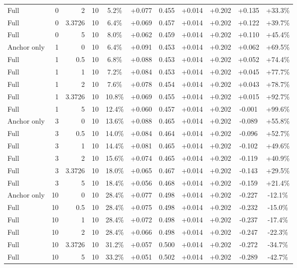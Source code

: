 \begin{table}[htbp]
\begin{tabular}{lrrrccccccc}
Full & 0 & 2 & 10 & 5.2\% & +0.077 & 0.455 & +0.014 & +0.202 & +0.135 & +33.3\% \\
Full & 0 & 3.3726 & 10 & 6.4\% & +0.069 & 0.457 & +0.014 & +0.202 & +0.122 & +39.7\% \\
Full & 0 & 5 & 10 & 8.0\% & +0.062 & 0.459 & +0.014 & +0.202 & +0.110 & +45.4\% \\
Anchor only & 1 & 0 & 10 & 6.4\% & +0.091 & 0.453 & +0.014 & +0.202 & +0.062 & +69.5\% \\
Full & 1 & 0.5 & 10 & 6.8\% & +0.088 & 0.453 & +0.014 & +0.202 & +0.052 & +74.4\% \\
Full & 1 & 1 & 10 & 7.2\% & +0.084 & 0.453 & +0.014 & +0.202 & +0.045 & +77.7\% \\
Full & 1 & 2 & 10 & 7.6\% & +0.078 & 0.454 & +0.014 & +0.202 & +0.043 & +78.7\% \\
Full & 1 & 3.3726 & 10 & 10.8\% & +0.069 & 0.455 & +0.014 & +0.202 & +0.015 & +92.7\% \\
Full & 1 & 5 & 10 & 12.4\% & +0.060 & 0.457 & +0.014 & +0.202 & -0.001 & +99.6\% \\
Anchor only & 3 & 0 & 10 & 13.6\% & +0.088 & 0.465 & +0.014 & +0.202 & -0.089 & +55.8\% \\
Full & 3 & 0.5 & 10 & 14.0\% & +0.084 & 0.464 & +0.014 & +0.202 & -0.096 & +52.7\% \\
Full & 3 & 1 & 10 & 14.4\% & +0.081 & 0.465 & +0.014 & +0.202 & -0.102 & +49.6\% \\
Full & 3 & 2 & 10 & 15.6\% & +0.074 & 0.465 & +0.014 & +0.202 & -0.119 & +40.9\% \\
Full & 3 & 3.3726 & 10 & 18.0\% & +0.065 & 0.467 & +0.014 & +0.202 & -0.143 & +29.5\% \\
Full & 3 & 5 & 10 & 18.4\% & +0.056 & 0.468 & +0.014 & +0.202 & -0.159 & +21.4\% \\
Anchor only & 10 & 0 & 10 & 28.4\% & +0.077 & 0.498 & +0.014 & +0.202 & -0.227 & -12.1\% \\
Full & 10 & 0.5 & 10 & 28.4\% & +0.075 & 0.498 & +0.014 & +0.202 & -0.232 & -15.0\% \\
Full & 10 & 1 & 10 & 28.4\% & +0.072 & 0.498 & +0.014 & +0.202 & -0.237 & -17.4\% \\
Full & 10 & 2 & 10 & 28.4\% & +0.066 & 0.498 & +0.014 & +0.202 & -0.247 & -22.3\% \\
Full & 10 & 3.3726 & 10 & 31.2\% & +0.057 & 0.500 & +0.014 & +0.202 & -0.272 & -34.7\% \\
Full & 10 & 5 & 10 & 33.2\% & +0.051 & 0.502 & +0.014 & +0.202 & -0.289 & -42.7\% \\

\end{tabular}
\end{table}
